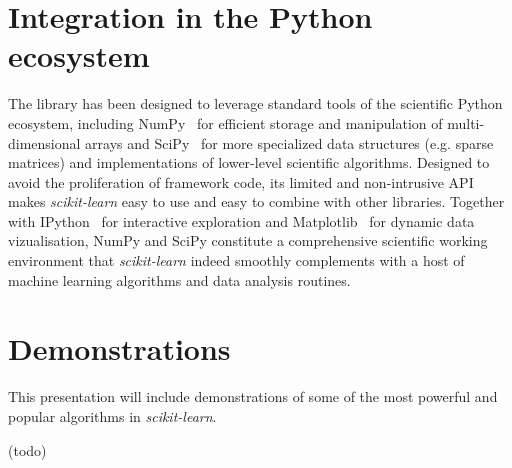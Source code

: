 \documentclass{article}
\newcommand{\sklearn}{\textit{scikit-learn}\xspace}
\DeclareRobustCommand{\VAN}[3]{#2}
\begin{document}
\section*{Integration in the Python ecosystem}

The library has been designed to leverage standard tools of the scientific
Python ecosystem, including NumPy~\citep{vanderwalt2011} for efficient storage
and manipulation of multi-dimensional arrays and
SciPy~\citep{oliphant2007python} for more specialized data structures  (e.g.
sparse matrices) and implementations of lower-level scientific algorithms.
Designed to avoid the proliferation of framework code, its limited and
non-intrusive API makes \sklearn easy to use and easy to combine with other
libraries. Together with IPython~\citep{perez2007ipython} for interactive exploration and Matplotlib~\citep{hunter2007matplotlib} for
dynamic data vizualisation, NumPy and SciPy constitute a comprehensive
scientific working environment that \sklearn indeed smoothly complements with a host of
machine learning algorithms and data analysis routines.



\section*{Demonstrations}

This presentation will include demonstrations of some of the most powerful and
popular algorithms in \sklearn.

(todo)


{\small

\DeclareRobustCommand{\VAN}[3]{#3}
\setlength{\bibsep}{1mm}

}
\end{document}
